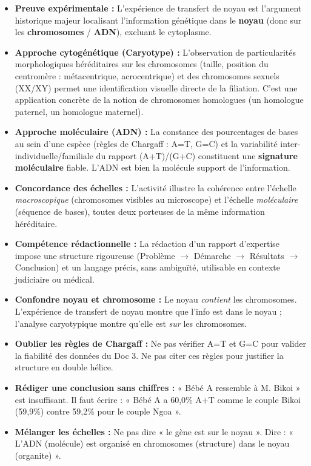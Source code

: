 \documentclass[11pt]{article}
\newcommand{\cle}[1]{{\popxbold\color{popdark}#1}}
\newcounter{popsec}
\newcounter{popsub}
\newcommand{\courssub}[1]{%
  \stepcounter{popsub}%
  \par\vspace{9pt}\noindent{\popxbold\fontsize{11.5}{13}\selectfont\color{popink}{\color{poporange}\thepopsec.\thepopsub}\hspace{6pt}#1}\par\nopagebreak\vspace{4pt}
}
\begin{document}
\courssub{Bilan de l'activité}
\begin{aretenir}
    \begin{itemize}
        \item \textbf{Preuve expérimentale :} L'expérience de transfert de noyau est l'argument historique majeur localisant l'information génétique dans le \textbf{noyau} (donc sur les \textbf{chromosomes} / \textbf{ADN}), excluant le cytoplasme.
        \item \textbf{Approche cytogénétique (Caryotype) :} L'observation de particularités morphologiques héréditaires sur les chromosomes (taille, position du centromère : métacentrique, acrocentrique) et des chromosomes sexuels (XX/XY) permet une identification visuelle directe de la filiation. C'est une application concrète de la notion de \cle{chromosomes homologues} (un homologue paternel, un homologue maternel).
        \item \textbf{Approche moléculaire (ADN) :} La constance des pourcentages de bases au sein d'une espèce (règles de Chargaff : A=T, G=C) et la variabilité inter-individuelle/familiale du rapport (A+T)/(G+C) constituent une \textbf{signature moléculaire} fiable. L'ADN est bien la molécule support de l'information.
        \item \textbf{Concordance des échelles :} L'activité illustre la cohérence entre l'échelle \emph{macroscopique} (chromosomes visibles au microscope) et l'échelle \emph{moléculaire} (séquence de bases), toutes deux porteuses de la même information héréditaire.
        \item \textbf{Compétence rédactionnelle :} La rédaction d'un rapport d'expertise impose une structure rigoureuse (Problème $\to$ Démarche $\to$ Résultats $\to$ Conclusion) et un langage précis, sans ambiguïté, utilisable en contexte judiciaire ou médical.
    \end{itemize}
\end{aretenir}

\begin{attention}
    \begin{itemize}
        \item \textbf{Confondre noyau et chromosome :} Le noyau \emph{contient} les chromosomes. L'expérience de transfert de noyau montre que l'info est dans le noyau ; l'analyse caryotypique montre qu'elle est \emph{sur} les chromosomes.
        \item \textbf{Oublier les règles de Chargaff :} Ne pas vérifier A=T et G=C pour valider la fiabilité des données du Doc 3. Ne pas citer ces règles pour justifier la structure en double hélice.
        \item \textbf{Rédiger une conclusion sans chiffres :} « Bébé A ressemble à M. Bikoi » est insuffisant. Il faut écrire : « Bébé A a 60,0\% A+T comme le couple Bikoi (59,9\%) contre 59,2\% pour le couple Ngoa ».
        \item \textbf{Mélanger les échelles :} Ne pas dire « le gène est sur le noyau ». Dire : « L'ADN (molécule) est organisé en chromosomes (structure) dans le noyau (organite) ».
    \end{itemize}
\end{attention}
\end{document}

